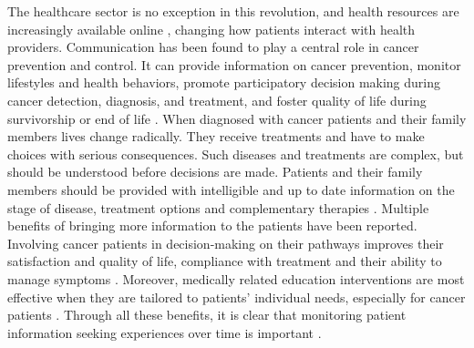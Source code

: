 The healthcare sector is no exception in this revolution, and health resources
are increasingly available online
\cite{viswanath_science_2005,viswanath_communications_2012}, changing how
patients interact with health providers. Communication has been found to play a
central role in cancer prevention and control. It can provide information on
cancer prevention, monitor lifestyles and health behaviors, promote
participatory decision making during cancer detection, diagnosis, and treatment,
and foster quality of life during survivorship or end of life
\cite{viswanath_communications_2012}. When diagnosed with cancer patients and
their family members lives change radically. They receive treatments and have to
make choices with serious consequences. Such diseases and treatments are
complex, but should be understood before decisions are made. Patients and their
family members should be provided with intelligible and up to date information
on the stage of disease, treatment options and complementary therapies
\cite{butow_dynamics_1997,cassileth_information_1980}.
Multiple benefits of bringing more information to the patients have been
reported. Involving cancer patients in decision-making on their pathways
improves their satisfaction and quality of life, compliance with treatment and
their ability to manage symptoms
\cite{johnson_effects_1982,hack_feasibility_1999,mohide_randomised_1996,mcpherson_effective_2001,
    sheabudgell_information_2014,huchcroft_testing_1984,cegala_patient_2003,viswanath_science_2005}.
Moreover, medically related education interventions are most effective when they
are tailored to patients' individual needs, especially for cancer patients
\cite{cegala_patient_2003}. Through all these benefits, it is clear that
monitoring patient information seeking experiences over time is important
\cite{finney_rutten_cancer-related_2016}.

